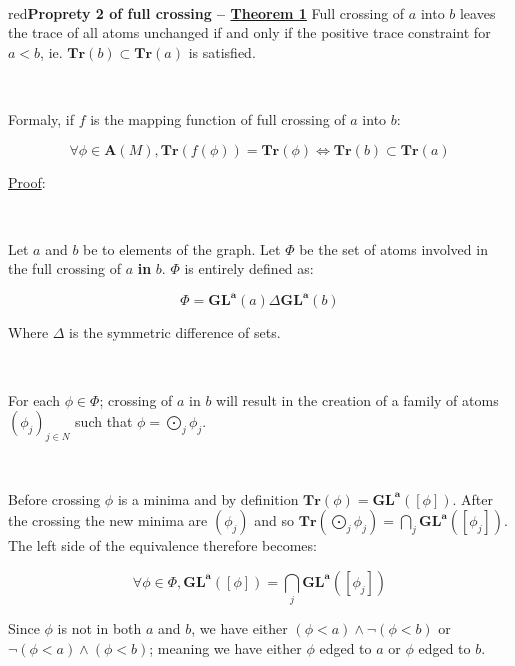 \documentclass[a4paper, 11pt]{article}
\begin{document}
\

\begin{mybox}{red}{\textbf{Proprety 2 of full crossing -- \underline{Theorem 1}}}
Full crossing of $a$ into $b$ leaves the trace of all atoms unchanged if and only if the positive trace constraint for $a < b$, ie. $\textbf{Tr}(b) \subset \textbf{Tr}(a)$ is satisfied. 

\

Formaly, if $f$ is the mapping function of full crossing of $a$ into $b$:

\begin{equation}
    \forall \phi \in \boldsymbol{A}(M), \textbf{Tr}(f(\phi)) = \textbf{Tr}(\phi) \Leftrightarrow \textbf{Tr}(b) \subset \textbf{Tr}(a)
\end{equation}

\end{mybox}

\noindent
\underline{Proof}:

\

Let $a$ and $b$ be to elements of the graph.
Let $\Phi$ be the set of atoms involved in the full crossing of $a$ \textbf{in} $b$. $\Phi$ is entirely defined as:

\begin{equation*}
    \Phi = \boldsymbol{GL}^{\boldsymbol{a}}(a) \Delta \boldsymbol{GL}^{\boldsymbol{a}}(b)
\end{equation*}

Where $\Delta$ is the symmetric difference of sets.

\

For each $\phi \in \Phi$; crossing of $a$ in $b$ will result in the creation of a family of atoms $(\phi_j)_{j\in N}$ such that $\phi = \bigodot_j \phi_j$. 

\

Before crossing $\phi$ is a minima and by definition $\textbf{Tr}(\phi) = \boldsymbol{GL}^{\boldsymbol{a}}([\phi])$. After the crossing the new minima are $(\phi_j)$ and so $\textbf{Tr}(\bigodot_j \phi_j) = \bigcap_j \boldsymbol{GL}^{\boldsymbol{a}}([\phi_j])$. The left side of the equivalence therefore becomes:

\begin{equation*}
    \forall \phi \in \Phi, \boldsymbol{GL}^{\boldsymbol{a}}([\phi]) = \bigcap_j \boldsymbol{GL}^{\boldsymbol{a}}([\phi_j])
\end{equation*}

Since $\phi$ is not in both $a$ and $b$, we have either $(\phi < a)\land \neg(\phi < b)$ or $\neg(\phi < a)\land (\phi < b)$; meaning we have either $\phi$ edged to $a$ or $\phi$ edged to $b$.
\end{document}
